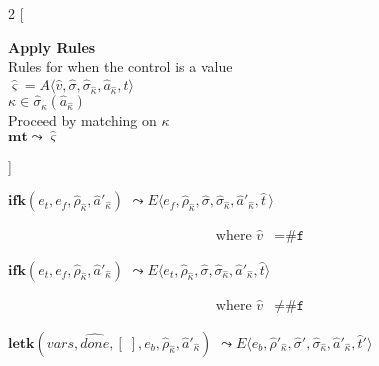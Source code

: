 \documentclass[12pt,draft]{article}
\newcommand{\falsesyn}{\texttt{\#f}}
\begin{document}
\begin{multicols*}{2}
[
\begin{center}
\textbf{Apply Rules} \\
Rules for when the control is a value \\
$\hat{\varsigma} = A\langle \hat{v} , \hat{\sigma} , \hat{\sigma}_{\hat{\kappa}} , \hat{a}_{\hat{\kappa}} , \hat{t} \rangle$ \\
$\kappa \in \hat{\sigma}_{\hat{\kappa}}(\hat{a}_{\hat{\kappa}})$ \\
Proceed by matching on $\kappa$ \\
\vspace{5mm}
$\textbf{mt} \leadsto \hat{\varsigma}$
\end{center}
\vspace{-5mm}
]
\begin{center}
  $\textbf{ifk}(e_t, e_f, \hat{\rho}_{\hat{\kappa}}, \hat{a}'_{\hat{\kappa}})$
  $\leadsto E\langle e_f , \hat{\rho}_{\hat{\kappa}} , \hat{\sigma} , \hat{\sigma}_{\hat{\kappa}} , \hat{a}'_{\hat{\kappa}} , \hat{t}\,\rangle$
\end{center}
\vspace{-7mm}
\begin{align*}
\text{where } \hat{v} &= \falsesyn
\end{align*}
\begin{center}
  $\textbf{ifk}(e_t, e_f, \hat{\rho}_{\hat{\kappa}}, \hat{a}'_{\hat{\kappa}})$
  $\leadsto E\langle e_t , \hat{\rho}_{\hat{\kappa}}, \hat{\sigma} , \hat{\sigma}_{\hat{\kappa}} , \hat{a}'_{\hat{\kappa}} , \hat{t} \rangle$
\end{center}
\vspace{-7mm}
\begin{align*}
\text{where } \hat{v} &\not= \falsesyn
\end{align*}
\begin{center}
  $\textbf{letk}(vars, \widehat{done}, [\;], e_b, \hat{\rho}_{\hat{\kappa}} , \hat{a}'_{\hat{\kappa}})$
  $\leadsto E\langle e_b , \hat{\rho}'_{\hat{\kappa}} , \hat{\sigma}' , \hat{\sigma}_{\hat{\kappa}} , \hat{a}'_{\hat{\kappa}} , \hat{t}'\rangle $
\end{center}
\vspace{-7mm}
\begin{align*}

\end{align*}
\end{multicols*}
\end{document}
